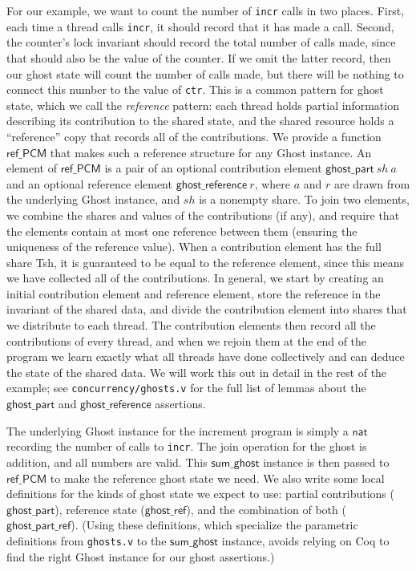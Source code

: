 \documentclass[11pt]{article}
\begin{document}
For our example, we want to count the number of \texttt{incr} calls in two places. First, each time a thread calls \texttt{incr}, it should record that it has made a call. Second, the counter's lock invariant should record the total number of calls made, since that should also be the value of the counter. If we omit the latter record, then our ghost state will count the number of calls made, but there will be nothing to connect this number to the value of \texttt{ctr}. This is a common pattern for ghost state, which we call the \emph{reference} pattern: each thread holds partial information describing its contribution to the shared state, and the shared resource holds a ``reference'' copy that records all of the contributions. We provide a function $\mathsf{ref\_PCM}$ that makes such a reference structure for any \textsf{Ghost} instance. An element of $\mathsf{ref\_PCM}$ is a pair of an optional contribution element $\mathsf{ghost\_part}\ \mathit{sh}\ a$ and an optional reference element $\mathsf{ghost\_reference}\ r$, where $a$ and $r$ are drawn from the underlying \textsf{Ghost} instance, and $\mathit{sh}$ is a nonempty share. To join two elements, we combine the shares and values of the contributions (if any), and require that the elements contain at most one reference between them (ensuring the uniqueness of the reference value). When a contribution element has the full share \textsf{Tsh}, it is guaranteed to be equal to the reference element, since this means we have collected all of the contributions. In general, we start by creating an initial contribution element and reference element, store the reference in the invariant of the shared data, and divide the contribution element into shares that we distribute to each thread. The contribution elements then record all the contributions of every thread, and when we rejoin them at the end of the program we learn exactly what all threads have done collectively and can deduce the state of the shared data. We will work this out in detail in the rest of the example; see \texttt{concurrency/ghosts.v} for the full list of lemmas about the $\mathsf{ghost\_part}$ and $\mathsf{ghost\_reference}$ assertions.

The underlying \textsf{Ghost} instance for the increment program is simply a $\mathsf{nat}$ recording the number of calls to \texttt{incr}. The join operation for the ghost is addition, and all numbers are valid. This $\mathsf{sum\_ghost}$ instance is then passed to $\mathsf{ref\_PCM}$ to make the reference ghost state we need. We also write some local definitions for the kinds of ghost state we expect to use: partial contributions ($\mathsf{ghost\_part}$), reference state ($\mathsf{ghost\_ref}$), and the combination of both ($\mathsf{ghost\_part\_ref}$). (Using these definitions, which specialize the parametric definitions from \texttt{ghosts.v} to the $\mathsf{sum\_ghost}$ instance, avoids relying on Coq to find the right \textsf{Ghost} instance for our ghost assertions.)
\end{document}
